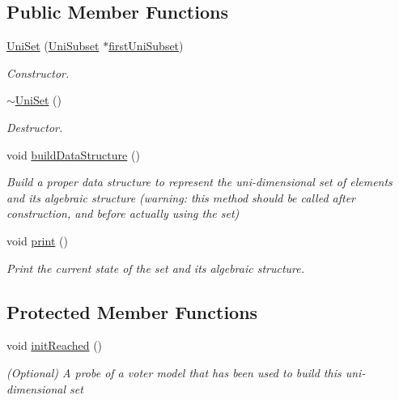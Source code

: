 \subsection*{Public Member Functions}
\begin{DoxyCompactItemize}
\item 
\hyperlink{classUniSet_a7e7a24e0c074fff21442f8ac9c5cd6aa}{Uni\-Set} (\hyperlink{classUniSubset}{Uni\-Subset} $\ast$\hyperlink{classUniSet_a8b2ca464176feddcd8d96c75514eba6b}{first\-Uni\-Subset})
\begin{DoxyCompactList}\small\item\em Constructor. \end{DoxyCompactList}\item 
\hypertarget{classUniSet_a702d623676d4b30b832bdf17c1768fbe}{\hyperlink{classUniSet_a702d623676d4b30b832bdf17c1768fbe}{$\sim$\-Uni\-Set} ()}\label{classUniSet_a702d623676d4b30b832bdf17c1768fbe}

\begin{DoxyCompactList}\small\item\em Destructor. \end{DoxyCompactList}\item 
\hypertarget{classUniSet_a0ce5a8030b92cbbf2a810eb03bf65846}{void \hyperlink{classUniSet_a0ce5a8030b92cbbf2a810eb03bf65846}{build\-Data\-Structure} ()}\label{classUniSet_a0ce5a8030b92cbbf2a810eb03bf65846}

\begin{DoxyCompactList}\small\item\em Build a proper data structure to represent the uni-\/dimensional set of elements and its algebraic structure (warning\-: this method should be called after construction, and before actually using the set) \end{DoxyCompactList}\item 
\hypertarget{classUniSet_a6a7601a93553783b443f4b4c65e3b1e8}{void \hyperlink{classUniSet_a6a7601a93553783b443f4b4c65e3b1e8}{print} ()}\label{classUniSet_a6a7601a93553783b443f4b4c65e3b1e8}

\begin{DoxyCompactList}\small\item\em Print the current state of the set and its algebraic structure. \end{DoxyCompactList}\end{DoxyCompactItemize}
\subsection*{Protected Member Functions}
\begin{DoxyCompactItemize}
\item 
void \hyperlink{classUniSet_a140f02dfb3f186cbc49fe28d238aa2e1}{init\-Reached} ()
\begin{DoxyCompactList}\small\item\em (Optional) A probe of a voter model that has been used to build this uni-\/dimensional set \end{DoxyCompactList}\end{DoxyCompactItemize}
